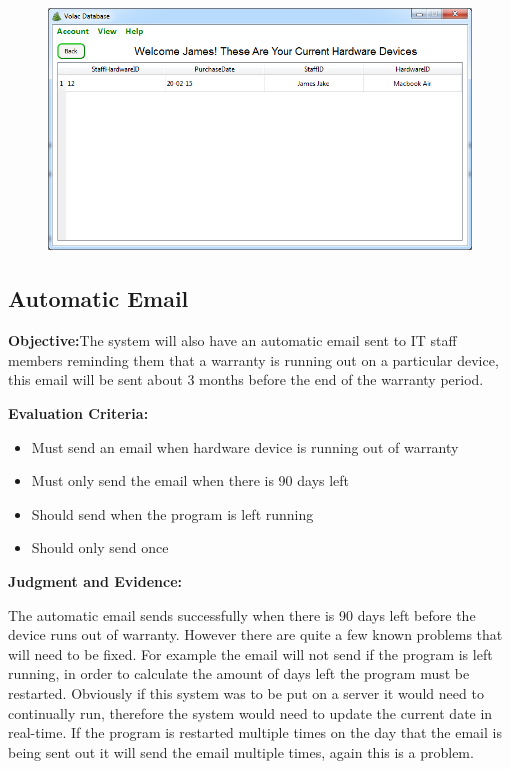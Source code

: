 \begin{figure}[H]
    \includegraphics[width=\textwidth]{./Evaluation/Images/login5.png}
\end{figure}


\subsection{Automatic Email}

\textbf{Objective:}The system will also have an automatic email sent to IT staff members reminding them that a warranty is running out on a particular device, this email will be sent about 3 months before the end of the warranty period.

\textbf{Evaluation Criteria:}
\begin{itemize}
\item{Must send an email when hardware device is running out of warranty}
\item{Must only send the email when there is 90 days left}
\item{Should send when the program is left running}
\item{Should only send once}
\end{itemize}

\textbf{Judgment and Evidence:}

The automatic email sends successfully when there is 90 days left before the device runs out of warranty. However there are quite a few known problems that will need to be fixed. For example the email will not send if the program is left running, in order to calculate the amount of days left the program must be restarted. Obviously if this system was to be put on a server it would need to continually run, therefore the system would need to update the current date in real-time. If the program is restarted multiple times on the day that the email is being sent out it will send the email multiple times, again this is a problem.

